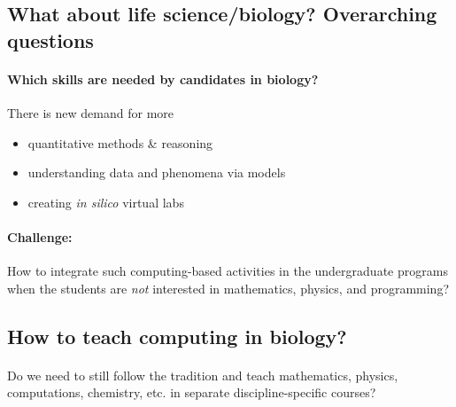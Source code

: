 \documentclass[%
twoside,                 %
final,                   %
10pt]{article}
\begin{document}
\noindent




\subsection{What about life science/biology? Overarching questions}


\paragraph{Which skills are needed by candidates in biology?}
There is new demand for more

\begin{itemize}
  \item quantitative methods {\&} reasoning

  \item understanding data and phenomena via models

  \item creating \emph{in silico} virtual labs
\end{itemize}

\noindent




\paragraph{Challenge:}
How to integrate such computing-based activities in the undergraduate programs
when the students are \emph{not} interested in mathematics, physics, and
programming?



\subsection{How to teach computing in biology?}


\paragraph{}
Do we need to still follow the tradition and teach mathematics, physics, computations, chemistry, etc. in separate discipline-specific courses?
\end{document}
